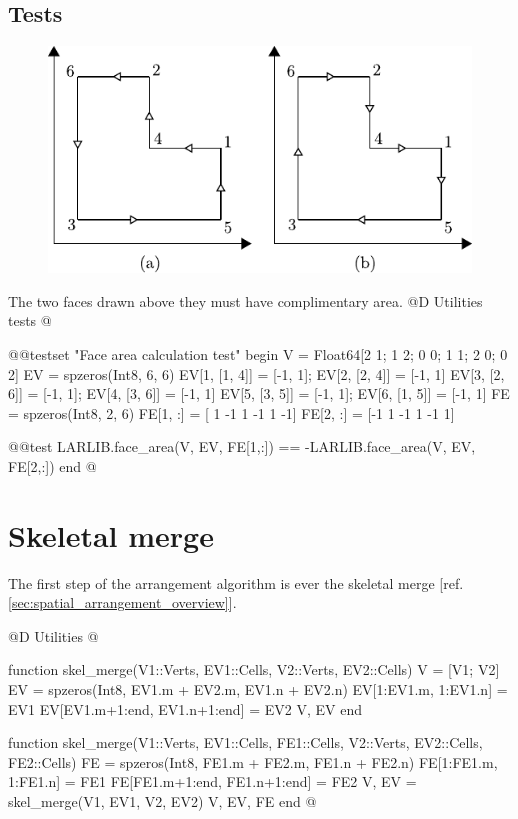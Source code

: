 \subsection{Tests}
\begin{figure}[h]
    \centering
    \includegraphics{./img/ch5-area_test.pdf}
\end{figure}
\noindent The two faces drawn above they must have complimentary area.
@D Utilities tests
@{@@testset "Face area calculation test" begin
    V = Float64[2 1; 1 2; 0 0; 1 1; 2 0; 0 2]
    EV = spzeros(Int8, 6, 6)
    EV[1, [1, 4]] = [-1, 1]; EV[2, [2, 4]] = [-1, 1]
    EV[3, [2, 6]] = [-1, 1]; EV[4, [3, 6]] = [-1, 1]
    EV[5, [3, 5]] = [-1, 1]; EV[6, [1, 5]] = [-1, 1]
    FE = spzeros(Int8, 2, 6)
    FE[1, :] = [ 1 -1  1 -1  1 -1]
    FE[2, :] = [-1  1 -1  1 -1  1]

    @@test LARLIB.face_area(V, EV, FE[1,:]) == -LARLIB.face_area(V, EV, FE[2,:])
end
@}

\section{Skeletal merge}
\label{sec:skel_merge}

The first step of the arrangement algorithm is ever
the skeletal merge [ref. \ref{sec:spatial_arrangement_overview}].

@D Utilities
@{function skel_merge(V1::Verts, EV1::Cells, V2::Verts, EV2::Cells)
    V = [V1; V2]
    EV = spzeros(Int8, EV1.m + EV2.m, EV1.n + EV2.n)
    EV[1:EV1.m, 1:EV1.n] = EV1
    EV[EV1.m+1:end, EV1.n+1:end] = EV2
    V, EV
end

function skel_merge(V1::Verts, EV1::Cells, FE1::Cells, V2::Verts, EV2::Cells, FE2::Cells)
    FE = spzeros(Int8, FE1.m + FE2.m, FE1.n + FE2.n)
    FE[1:FE1.m, 1:FE1.n] = FE1
    FE[FE1.m+1:end, FE1.n+1:end] = FE2
    V, EV = skel_merge(V1, EV1, V2, EV2)
    V, EV, FE
end
@}

